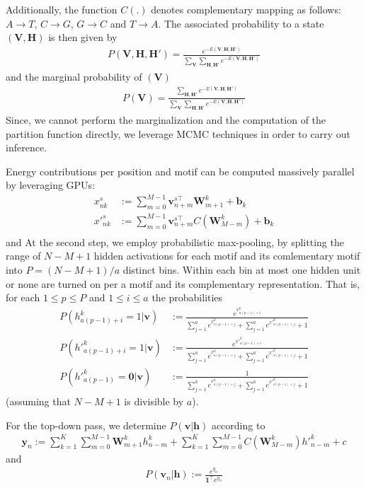 \documentclass[12pt]{article}
\begin{document}
 Additionally, the function $C(.)$ denotes complementary mapping
as follows: $A\rightarrow T$, 
$C\rightarrow G$, $G\rightarrow C$ and $T\rightarrow A$.
The associated probability to a state $(\mathbf{V},\mathbf{H})$ is then given
by
\begin{align}
	P(\mathbf{V},\mathbf{H}, \mathbf{H}')=\frac{e^{-E(\mathbf{V},\mathbf{H},\mathbf{H}')}}
	{\sum_{\mathbf{V}}\sum_{\mathbf{H}, \mathbf{H}'}e^{-E(\mathbf{V},\mathbf{H},\mathbf{H}')}}
\end{align}
and the marginal probability of $(\mathbf{V})$
\begin{align}
	P(\mathbf{V})=\frac{\sum_{\mathbf{H}, \mathbf{H}'}e^{-E(\mathbf{V},\mathbf{H},\mathbf{H}')}}
	{\sum_{\mathbf{V}}\sum_{\mathbf{H},\mathbf{H}'}e^{-E(\mathbf{V},\mathbf{H},\mathbf{H}')}}
\end{align}
Since, we cannot perform the marginalization and the computation of the
partition function directly, we leverage MCMC techniques in order
to carry out inference.\par
Energy contributions per position and motif can be computed massively parallel
by leveraging GPUs:
\begin{align}
	x_{nk}^s&:=\sum_{m=0}^{M-1}\mathbf{v}_{n+m}^{s\top} \mathbf{W}_{m+1}^k + \mathbf{b}_k\\
	{x'}_{nk}^s&:=\sum_{m=0}^{M-1}\mathbf{v}_{n+m}^{s\top} C(\mathbf{W}_{M-m}^k) + \mathbf{b}_k\\
\end{align}
and 
At the second step, we employ probabilistic max-pooling, 
by splitting the range of $N-M+1$ hidden activations for
each motif and its comlementary motif into $P=(N-M+1)/a$ distinct bins.
Within each bin at most one hidden unit or none 
 are turned on per a motif and its complementary representation.
That is, for each $1\leq p\leq P$ and $1\leq i\leq a$ the probabilities
\begin{align}
	P(h_{a(p-1)+i}^k=1|\mathbf{v})&:=\frac{e^{x_{a(p-1)+i}^k}}{\sum_{j=1}^a e^{x_{a(p-1)+j}^k}+ \sum_{j=1}^a e^{{x'}_{a(p-1)+j}^k}+1}\\
	P({h'}_{a(p-1)+i}^k=1|\mathbf{v})&:=\frac{e^{{x'}_{a(p-1)+i}^k}}{\sum_{j=1}^{a} e^{x_{a(p-1)+j}^k}+ \sum_{j=1}^a e^{{x'}_{a(p-1)+j}^k}+1}\\
	P({h'}_{a(p-1)}^k=\mathbf{0}|\mathbf{v})&:=\frac{1}{\sum_{j=1}^a e^{x_{a(p-1)+j}^k}+ \sum_{j=1}^a e^{{x'}_{a(p-1)+j}^k}+1}
\end{align}
(assuming that $N-M+1$ is divisible by $a$).\par
For the top-down pass, we determine $P(\mathbf{v}|\mathbf{h})$ according to
\begin{align}
	\mathbf{y}_n:=\sum_{k=1}^K\sum_{m=0}^{M-1} \mathbf{W}_{m+1}^k h_{n-m}^k + \sum_{k=1}^K\sum_{m=0}^{M-1} C(\mathbf{W}_{M-m}^k) {h'}_{n-m}^k + c
\end{align}
and 
\begin{align}
	P(\mathbf{v}_n|\mathbf{h}):=\frac{e^{y_n}}{\mathbf{1}^\top e^{y_n}}
\end{align}
\end{document}
